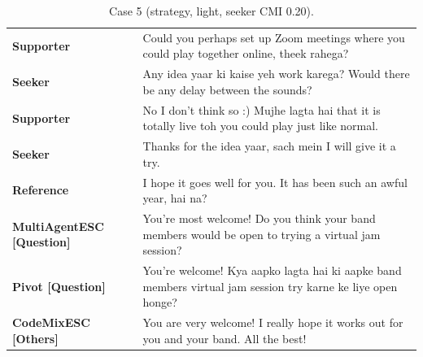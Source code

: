 \begin{table}[t]
\centering\footnotesize
\caption{Case 5 (strategy, light, seeker CMI 0.20).}
\label{tab:case5}
\begin{tabular}{@{}p{}p{}@{}}
\toprule
\textbf{Supporter} & Could you perhaps set up Zoom meetings where you could play together online, theek rahega? \\
\textbf{Seeker} & Any idea yaar ki kaise yeh work karega? Would there be any delay between the sounds? \\
\textbf{Supporter} & No I don't think so :) Mujhe lagta hai that it is totally live toh you could play just like normal. \\
\textbf{Seeker} & Thanks for the idea yaar, sach mein I will give it a try. \\
\textbf{Reference} & I hope it goes well for you. It has been such an awful year, hai na? \\
\textbf{MultiAgentESC [Question]} & You're most welcome! Do you think your band members would be open to trying a virtual jam session? \\
\textbf{Pivot [Question]} & You're welcome! Kya aapko lagta hai ki aapke band members virtual jam session try karne ke liye open honge? \\
\textbf{CodeMixESC [Others]} & You are very welcome! I really hope it works out for you and your band. All the best! \\
\bottomrule
\end{tabular}
\end{table}

